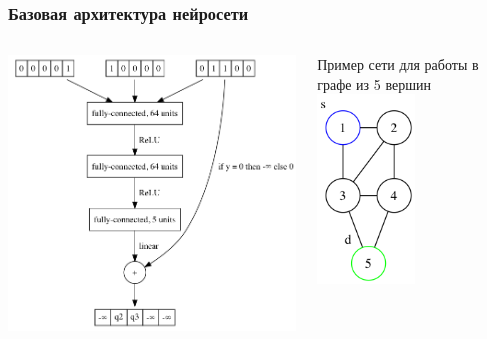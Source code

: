 \documentclass{beamer}
\begin{document}
\begin{frame}
  \frametitle{Базовая архитектура нейросети}
  \begin{columns}
    \begin{column}{0.6\textwidth}
      \begin{center}
        \includegraphics[width=\textwidth]{pic-nn-1}
      \end{center}
    \end{column}
    \begin{column}{0.4\textwidth}
      \begin{center}
        Пример сети для работы в графе из 5 вершин
        \includegraphics[width=0.5\textwidth]{graph-1}
      \end{center}
    \end{column}
  \end{columns}
\end{frame}
\end{document}

